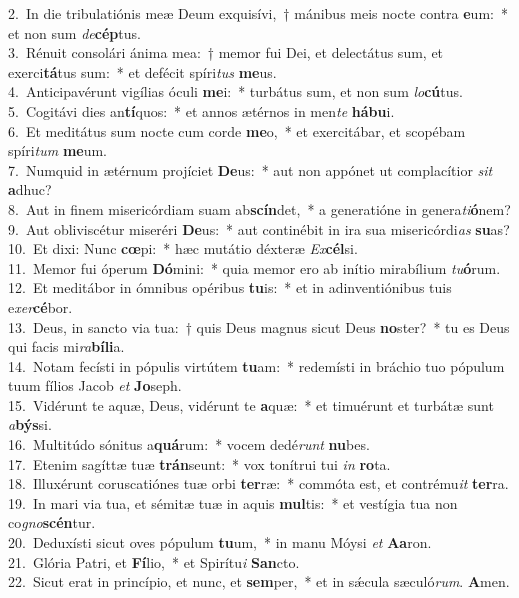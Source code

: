 {2.~}In die tribulatiónis meæ Deum exquisívi,~† mánibus meis nocte contra \textbf{e}um:~* et non sum \textit{de}\textbf{cép}tus.\\
{3.~}Rénuit consolári ánima mea:~† memor fui Dei, et delectátus sum, et exerci\textbf{tá}tus sum:~* et defécit spíri\textit{tus} \textbf{me}us.\\
{4.~}Anticipavérunt vigílias óculi \textbf{me}i:~* turbátus sum, et non sum \textit{lo}\textbf{cú}tus.\\
{5.~}Cogitávi dies an\textbf{tí}quos:~* et annos ætérnos in men\textit{te} \textbf{há}\textbf{bu}i.\\
{6.~}Et meditátus sum nocte cum corde \textbf{me}o,~* et exercitábar, et scopébam spíri\textit{tum} \textbf{me}um.\\
{7.~}Numquid in ætérnum projíciet \textbf{De}us:~* aut non appónet ut complacítior \textit{sit} \textbf{a}dhuc?\\
{8.~}Aut in finem misericórdiam suam ab\textbf{scín}det,~* a generatióne in genera\textit{ti}\textbf{ó}nem?\\
{9.~}Aut obliviscétur miseréri \textbf{De}us:~* aut continébit in ira sua misericórdi\textit{as} \textbf{su}as?\\
{10.~}Et dixi: Nunc \textbf{cœ}pi:~* hæc mutátio déxteræ \textit{Ex}\textbf{cél}si.\\
{11.~}Memor fui óperum \textbf{Dó}mini:~* quia memor ero ab inítio mirabílium \textit{tu}\textbf{ó}rum.\\
{12.~}Et meditábor in ómnibus opéribus \textbf{tu}is:~* et in adinventiónibus tuis e\textit{xer}\textbf{cé}bor.\\
{13.~}Deus, in sancto via tua:~† quis Deus magnus sicut Deus \textbf{no}ster?~* tu es Deus qui facis mi\textit{ra}\textbf{bí}\textbf{li}a.\\
{14.~}Notam fecísti in pópulis virtútem \textbf{tu}am:~* redemísti in bráchio tuo pópulum tuum fílios Jacob \textit{et} \textbf{Jo}seph.\\
{15.~}Vidérunt te aquæ, Deus, vidérunt te \textbf{a}quæ:~* et timuérunt et turbátæ sunt \textit{a}\textbf{býs}si.\\
{16.~}Multitúdo sónitus a\textbf{quá}rum:~* vocem dedé\textit{runt} \textbf{nu}bes.\\
{17.~}Etenim sagíttæ tuæ \textbf{trán}seunt:~* vox tonítrui tui \textit{in} \textbf{ro}ta.\\
{18.~}Illuxérunt coruscatiónes tuæ orbi \textbf{ter}ræ:~* commóta est, et contrému\textit{it} \textbf{ter}ra.\\
{19.~}In mari via tua, et sémitæ tuæ in aquis \textbf{mul}tis:~* et vestígia tua non co\textit{gno}\textbf{scén}tur.\\
{20.~}Deduxísti sicut oves pópulum \textbf{tu}um,~* in manu Móysi \textit{et} \textbf{A}\textbf{a}ron.\\
{21.~}Glória Patri, et \textbf{Fí}lio,~* et Spirítu\textit{i} \textbf{San}cto.\\
{22.~}Sicut erat in princípio, et nunc, et \textbf{sem}per,~* et in sǽcula sæculó\textit{rum}. \textbf{A}men.\\
